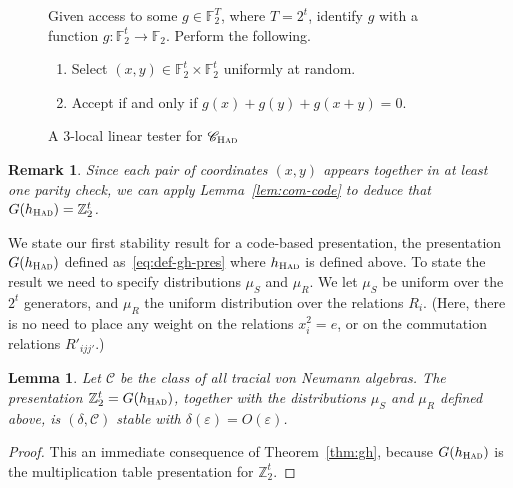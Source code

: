 \documentclass[11pt]{article}
\newtheorem{lemma}[theorem]{Lemma}
\newtheorem{remark}[theorem]{Remark}
\theoremstyle{definition}
\newcommand{\code}{\mathscr{C}}
\newcommand{\F}{\ensuremath{\mathbb{F}}}
\newcommand{\Z}{\ensuremath{\mathbb{Z}}}
\newcommand{\mC}{\ensuremath{\mathcal{C}}}
\newcommand{\had}{\textsc{Had}}
\newcommand{\eps}{\varepsilon}
\newenvironment{gamespec}{
  \begin{mdframed}[style=figstyle]}{
  \end{mdframed}}
\begin{document}
\begin{figure}[!htbp]
  \centering
  \begin{gamespec}
	Given access to some $g\in \F_2^T$, where $T=2^t$, identify $g$ with a function $g:\F_2^t\to\F_2$. Perform the following. 
\begin{enumerate}
\item Select $(x,y)\in \F_2^t \times \F_2^t$ uniformly at random. 
\item Accept if and only if $g(x)+g(y)+g(x+y)=0$.  	
    \end{enumerate}
  \end{gamespec}
  \caption{A $3$-local linear tester for $\code_{\had}$}
  \label{fig:test-had}
\end{figure}

\begin{remark}
Since each pair of coordinates $(x,y)$ appears together in at least one parity check, we can apply Lemma~\ref{lem:com-code} to deduce that $G(h_\had)=\Z_2^t$. 
\end{remark}

We state our first stability result for a code-based presentation, the presentation $G(h_\had)$ defined as~\eqref{eq:def-gh-pres} where $h_\had$ is defined above. To state the result we need to specify distributions $\mu_S$ and $\mu_R$. We let $\mu_S$ be uniform over the $2^t$ generators, and $\mu_R$ the uniform distribution over the relations $R_{i}$. (Here, there is no need to place any weight on the relations $x_i^2=e$, or on the commutation relations $R'_{ijj'}$.)  

\begin{lemma}\label{lem:had-stab}
Let $\mC$ be the class of all tracial von Neumann algebras. 
The presentation $\Z_2^t= G(h_\had)$, together with the distributions $\mu_S$ and $\mu_R$ defined above, is $(\delta,\mC)$ stable with $\delta(\eps)=O(\eps)$. 
\end{lemma}

\begin{proof}
This an immediate consequence of Theorem~\ref{thm:gh}, because $G(h_\had)$ is the multiplication table presentation for $\Z_2^t$.
\end{proof}
\end{document}
